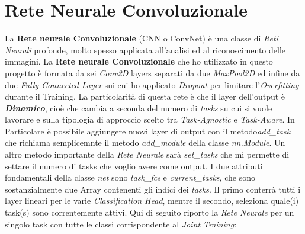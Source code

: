 \section{Rete Neurale Convoluzionale}
La \textbf{Rete neurale Convoluzionale} (CNN o ConvNet) è una classe di \textit{Reti Neurali} profonde, molto spesso  applicata all'analisi ed al riconoscimento delle immagini.
La \textbf{Rete neurale Convoluzionale} che ho utilizzato in questo progetto è formata da sei \textit{Conv2D} layers separati da due \textit{MaxPool2D} ed infine da due \textit{Fully Connected Layer} sui cui ho applicato \textit{Dropout} per limitare l'\textit{Overfitting} durante il Training.
\newline
La particolarità di questa rete è che il layer dell'output è \textbf{\textit{Dinamico}}, cioè che cambia a seconda del numero di \textit{tasks} su cui si vuole lavorare e sulla tipologia di approccio scelto tra \textit{Task-Agnostic} e \textit{Task-Aware}.\newline
In Particolare è possibile aggiungere nuovi layer di output con il metodo\textit{add\_task} che richiama semplicemnte il metodo \textit{add\_module} della classe \textit{nn.Module}.
Un altro metodo importante della \textit{Rete Neurale} sarà  \textit{set\_tasks} che mi permette di settare il numero di tasks che voglio avere come output. I due attributi fondamentali della classe \textit{net} sono \textit{task\_fcs} e \textit{current\_tasks}, che sono sostanzialmente due Array contenenti gli indici dei \textit{tasks}. Il primo conterrà tutti i layer lineari per le varie  \textit{Classification Head}, mentre il secondo, seleziona quale(i) task(s) sono correntemente attivi.
Qui di seguito riporto la \textit{Rete Neurale} per un singolo task con tutte le classi corrispondente al \textit{Joint Training}:

